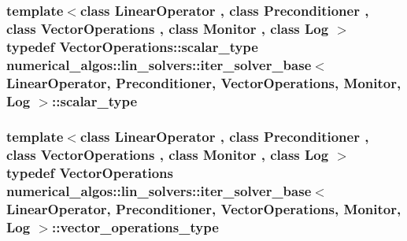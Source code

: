 \hypertarget{classnumerical__algos_1_1lin__solvers_1_1iter__solver__base_a64c84955e85f9cc556fa8628edc8f7c8}{
\subsubsection[{scalar\-\_\-type}]{\setlength{\rightskip}{0pt plus 5cm}template$<$class Linear\-Operator , class Preconditioner , class Vector\-Operations , class Monitor , class Log $>$ typedef Vector\-Operations\-::scalar\-\_\-type {\bf numerical\-\_\-algos\-::lin\-\_\-solvers\-::iter\-\_\-solver\-\_\-base}$<$ Linear\-Operator, Preconditioner, Vector\-Operations, Monitor, Log $>$\-::{\bf scalar\-\_\-type}}}\label{classnumerical__algos_1_1lin__solvers_1_1iter__solver__base_a64c84955e85f9cc556fa8628edc8f7c8}
\hypertarget{classnumerical__algos_1_1lin__solvers_1_1iter__solver__base_a1c0c7f5af3b439d5a53ce2433d6acb79}{
\subsubsection[{vector\-\_\-operations\-\_\-type}]{\setlength{\rightskip}{0pt plus 5cm}template$<$class Linear\-Operator , class Preconditioner , class Vector\-Operations , class Monitor , class Log $>$ typedef Vector\-Operations {\bf numerical\-\_\-algos\-::lin\-\_\-solvers\-::iter\-\_\-solver\-\_\-base}$<$ Linear\-Operator, Preconditioner, Vector\-Operations, Monitor, Log $>$\-::{\bf vector\-\_\-operations\-\_\-type}}}\label{classnumerical__algos_1_1lin__solvers_1_1iter__solver__base_a1c0c7f5af3b439d5a53ce2433d6acb79}
